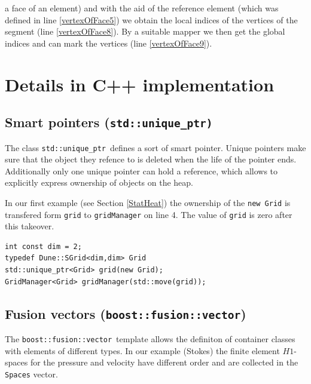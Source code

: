 \documentclass[11pt]{article}
\newcommand{\uniqueptr}{{\tt std::unique\_ptr}}
\newcommand{\fusionvector}{{\tt boost::fusion::vector}}
\begin{document}
a face of an element) and with the aid of the reference element (which was defined in line \ref{vertexOfFace5}) we obtain the local indices of the vertices of the segment (line \ref{vertexOfFace8}). By a suitable mapper we then get the global indices and can mark the vertices (line \ref{vertexOfFace9}).



\section{Details in C++ implementation}  \label{details}
\subsection{Smart pointers (\tt{std::unique\_ptr})\label{cpp_auto_ptr}}
The class \uniqueptr\ defines a sort of smart pointer. Unique pointers make sure that the object they refence to is deleted when the life of the pointer ends. Additionally only one unique pointer can hold a reference, which allows to explicitly express ownership of objects on the heap.

In our first example (see Section \ref{StatHeat}) the ownership of the {\tt new Grid} is transfered form {\tt grid} to {\tt gridManager} on line 4. The value of {\tt grid} is zero after this takeover.\\

\begin{lstlisting}
int const dim = 2;
typedef Dune::SGrid<dim,dim> Grid
std::unique_ptr<Grid> grid(new Grid);
GridManager<Grid> gridManager(std::move(grid));
\end{lstlisting}


\subsection{Fusion vectors (\fusionvector)}

The \fusionvector\ template allows the definiton of container classes with elements of different types. In our example (Stokes) the finite element $H1$-spaces for the pressure and velocity have different order and are collected in the {\tt Spaces} vector.\\
\end{document}
